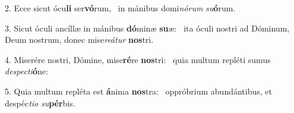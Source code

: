 2. Ecce sicut ócu\textbf{li} ser\textbf{vó}rum, \ast\  in mánibus domi\textit{nó}\textit{rum} \textit{su}\textbf{ó}rum.\

3. Sicut óculi ancíllæ in mánibus \textbf{dó}minæ \textbf{su}æ: \ast\  ita óculi nostri ad Dóminum, Deum nostrum, donec mise\textit{re}\textit{á}\textit{tur} \textbf{nos}tri.\

4. Miserére nostri, Dómine, mise\textbf{ré}re \textbf{nos}tri: \ast\  quia multum repléti sumus \textit{de}\textit{spec}\textit{ti}\textbf{ó}ne:\

5. Quia multum repléta est \textbf{á}nima \textbf{nos}tra: \ast\  oppróbrium abundántibus, et despéc\textit{ti}\textit{o} \textit{su}\textbf{pér}bis.\

